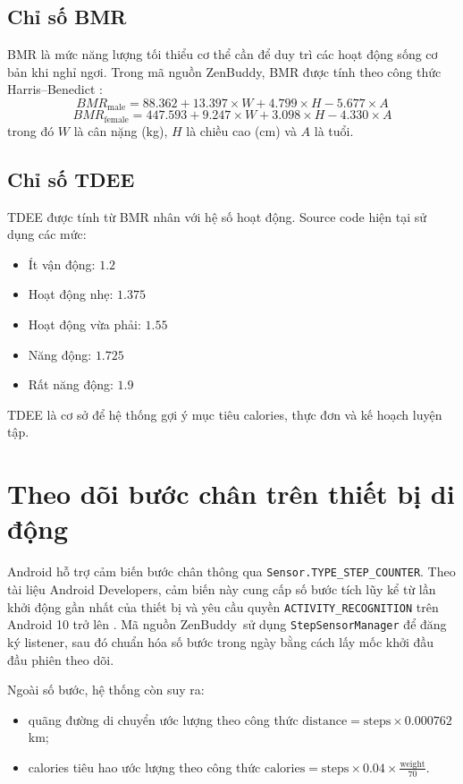 \documentclass{zenbuddy-report}
\newcommand{\appname}{ZenBuddy}
\begin{document}
\subsection{Chỉ số BMR}
BMR là mức năng lượng tối thiểu cơ thể cần để duy trì các hoạt động sống cơ bản khi nghỉ ngơi. Trong mã nguồn \appname, BMR được tính theo công thức Harris--Benedict \cite{harris-benedict1918}:
\begin{equation}
BMR_{\mathrm{male}} = 88.362 + 13.397 \times W + 4.799 \times H - 5.677 \times A
\end{equation}
\begin{equation}
BMR_{\mathrm{female}} = 447.593 + 9.247 \times W + 3.098 \times H - 4.330 \times A
\end{equation}
trong đó \(W\) là cân nặng (kg), \(H\) là chiều cao (cm) và \(A\) là tuổi.

\subsection{Chỉ số TDEE}
TDEE được tính từ BMR nhân với hệ số hoạt động. Source code hiện tại sử dụng các mức:
\begin{itemize}
  \item Ít vận động: \(1.2\)
  \item Hoạt động nhẹ: \(1.375\)
  \item Hoạt động vừa phải: \(1.55\)
  \item Năng động: \(1.725\)
  \item Rất năng động: \(1.9\)
\end{itemize}
TDEE là cơ sở để hệ thống gợi ý mục tiêu calories, thực đơn và kế hoạch luyện tập.

\section{Theo dõi bước chân trên thiết bị di động}
Android hỗ trợ cảm biến bước chân thông qua \texttt{Sensor.TYPE\_STEP\_COUNTER}. Theo tài liệu Android Developers, cảm biến này cung cấp số bước tích lũy kể từ lần khởi động gần nhất của thiết bị và yêu cầu quyền \texttt{ACTIVITY\_RECOGNITION} trên Android 10 trở lên \cite{android-step-counter}. Mã nguồn \appname\ sử dụng \texttt{StepSensorManager} để đăng ký listener, sau đó chuẩn hóa số bước trong ngày bằng cách lấy mốc khởi đầu đầu phiên theo dõi.

Ngoài số bước, hệ thống còn suy ra:
\begin{itemize}
  \item quãng đường di chuyển ước lượng theo công thức \(\text{distance} = \text{steps} \times 0.000762\) km;
  \item calories tiêu hao ước lượng theo công thức \(\text{calories} = \text{steps} \times 0.04 \times \frac{\text{weight}}{70}\).
\end{itemize}
\end{document}
